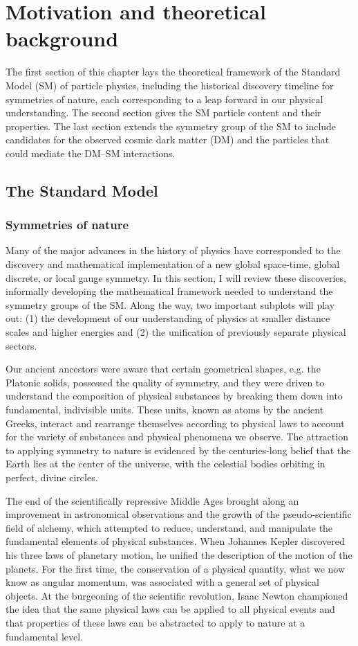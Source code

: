 \chapter{Motivation and theoretical background}

The first section of this chapter lays the theoretical framework of the Standard Model (SM) of particle physics, including the historical discovery timeline for symmetries of nature, each corresponding to a leap forward in our physical understanding. The second section gives the SM particle content and their properties. The last section extends the symmetry group of the SM to include candidates for the observed cosmic dark matter (DM) and the particles that could mediate the DM--SM interactions.

\section{The Standard Model}

\subsection{Symmetries of nature}

Many of the major advances in the history of physics have corresponded to the discovery and mathematical implementation of a new global space-time, global discrete, or local gauge symmetry. In this section, I will review these discoveries, informally developing the mathematical framework needed to understand the symmetry groups of the SM. Along the way, two important subplots will play out: (1) the development of our understanding of physics at smaller distance scales and higher energies and (2) the unification of previously separate physical sectors.

\indent Our ancient ancestors were aware that certain geometrical shapes, e.g. the Platonic solids, possessed the quality of symmetry, and they were driven to understand the composition of physical substances by breaking them down into fundamental, indivisible units. These units, known as atoms by the ancient Greeks, interact and rearrange themselves according to physical laws to account for the variety of substances and physical phenomena we observe. The attraction to applying symmetry to nature is evidenced by the centuries-long belief that the Earth lies at the center of the universe, with the celestial bodies orbiting in perfect, divine circles.

\indent The end of the scientifically repressive Middle Ages brought along an improvement in astronomical observations and the growth of the pseudo-scientific field of alchemy, which attempted to reduce, understand, and manipulate the fundamental elements of physical substances. When Johannes Kepler discovered his three laws of planetary motion, he unified the description of the motion of the planets. For the first time, the conservation of a physical quantity, what we now know as angular momentum, was associated with a general set of physical objects. At the burgeoning of the scientific revolution, Isaac Newton championed the idea that the same physical laws can be applied to all physical events and that properties of these laws can be abstracted to apply to nature at a fundamental level.

